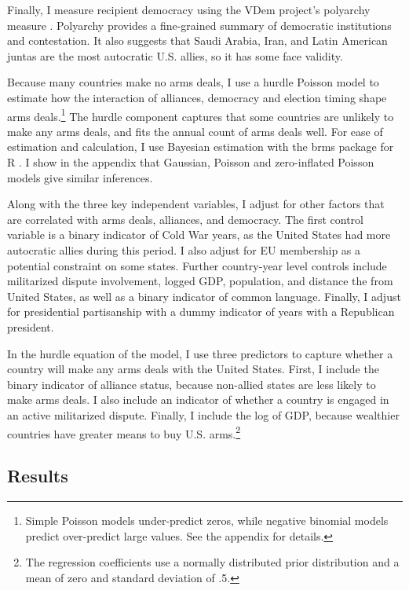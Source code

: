 \documentclass[12pt]{article}
\begin{document}
Finally, I measure recipient democracy using the VDem project's polyarchy measure \citep{Coppedgeetal2008}. 
Polyarchy provides a fine-grained summary of democratic institutions and contestation.
It also suggests that Saudi Arabia, Iran, and Latin American juntas are the most autocratic U.S. allies, so it has some face validity.  


Because many countries make no arms deals, I use a hurdle Poisson model to estimate how the interaction of alliances, democracy and election timing shape arms deals.\footnote{Simple Poisson models under-predict zeros, while negative binomial models predict over-predict large values. See the appendix for details.} 
The hurdle component captures that some countries are unlikely to make any arms deals, and fits the annual count of arms deals well.
For ease of estimation and calculation, I use Bayesian estimation with the brms package for \textsf{R} \citep{Buerkner2017}. 
I show in the appendix that Gaussian, Poisson and zero-inflated Poisson models give similar inferences. 


Along with the three key independent variables, I adjust for other factors that are correlated with arms deals, alliances, and democracy. 
The first control variable is a binary indicator of Cold War years, as the United States had more autocratic allies during this period. 
I also adjust for EU membership as a potential constraint on some states. 
Further country-year level controls include militarized dispute involvement, logged GDP, population, and distance the from United States, as well as a binary indicator of common language. 
Finally, I adjust for presidential partisanship with a dummy indicator of years with a Republican president.  


In the hurdle equation of the model, I use three predictors to capture whether a country will make any arms deals with the United States. 
First, I include the binary indicator of alliance status, because non-allied states are less likely to make arms deals. 
I also include an indicator of whether a country is engaged in an active militarized dispute. 
Finally, I include the log of GDP, because wealthier countries have greater means to buy U.S. arms.\footnote{The regression coefficients use a normally distributed prior distribution and a mean of zero and standard deviation of .5.}


\subsection{Results}
\end{document}
